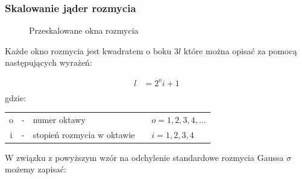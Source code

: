 \subsubsection{Skalowanie jąder rozmycia}
\begin{figure}[!htb]
\centering
{}
\caption{Przeskalowane okna rozmycia}
\label{fig:surf_bay_prescale_gaussian}
\end{figure}
Każde okno rozmycia jest kwadratem o boku $3l$ które można opisać za pomocą następujących wyrażeń:

\begin{align}
 l &= 2^oi+1\\
\label{eqn:liczym_l}
\end{align}
gdzie:

{\centering
\begin{tabular}{cclll}
o & - &  numer oktawy     &&$o=1,2,3,4,...$\\ 
i & - & stopień rozmycia w oktawie &&$i=1,2,3,4$\\ 
\end{tabular} 
}


W związku z powyższym wzór na odchylenie standardowe rozmycia Gaussa $\sigma$ możemy zapisać:


